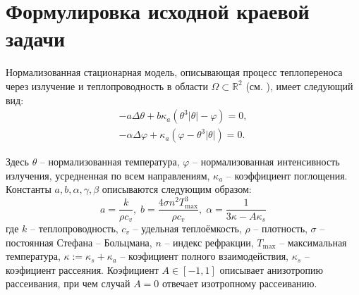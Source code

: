 \documentclass[12pt,a4paper]{article}%
\begin{document}


\section{Формулировка исходной краевой задачи}
    Нормализованная стационарная модель, описывающая процесс теплопереноса через излучение и теплопроводность в области $\Omega \subset \mathbb{R}^2$ (см. \cite{OControl_1}), имеет следующий вид:
    \begin{equation}
        \label{initial}
        \begin{aligned}
            - a \Delta \theta + b \kappa_a(\theta ^ 3 | \theta | - \varphi) = 0,  \\
            - \alpha \Delta \varphi + \kappa_a (\varphi - \theta ^3 | \theta |) = 0.
        \end{aligned}
    \end{equation}

    Здесь $\theta$ -- нормализованная температура, $\varphi$ -- нормализованная интенсивность излучения, усредненная по всем направлениям, $\kappa_a$ -- коэффициент поглощения. Константы $a, b, \alpha, \gamma, \beta$ описываются следующим образом:
    $$
    a = \frac{k}{\rho c_v}, \; b = \frac{4 \sigma n^2 T^3_{\text{max}}}{\rho c_v}, \; \alpha = \frac{1}{3\kappa -A \kappa_s}
    $$
    где $k$ -- теплопроводность, $c_v$ -- удельная теплоёмкость, $\rho$ -- плотность, $\sigma$ -- постоянная Стефана -- Больцмана, $n$ -- индекс рефракции, $T_{\text{max}}$ -- максимальная температура, $\kappa := \kappa_s + \kappa_a$ -- коэфициент полного взаимодействия, $\kappa_s$ -- коэфициент рассеяния. Коэфициент $A \in [-1,1]$ описывает анизотропию рассеивания, при чем случай $A=0$ отвечает изотропному рассеиванию.
\end{document}
